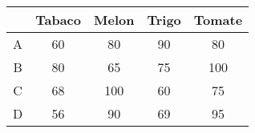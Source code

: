     \begin{tabular}{ccccc}
            & Tabaco  & Melon   & Trigo   & Tomate \bigstrut[b]\\
    \hline
    \hline
    A       & 60      & 80      & 90      & 80 \bigstrut[t]\\
    B       & 80      & 65      & 75      & 100 \\
    C       & 68      & 100     & 60      & 75 \\
    D       & 56      & 90      & 69      & 95 \bigstrut[b]\\
    \hline
    \hline
    \end{tabular}%
